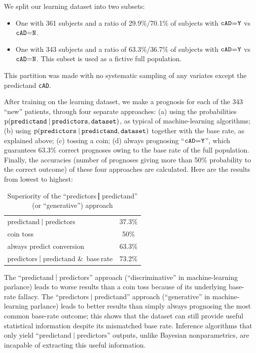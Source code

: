 \documentclass[a4paper,12pt,%
onecolumn,oneside,article,%
british%
]{memoir}
\theoremstyle{remark}
\theoremstyle{innote}
\newcommand*{\amp}{\&}
\newcommand*{\p}{\mathrm{p}}%
\renewcommand*{\|}[1][]{\nonscript\:#1\vert\nonscript\:\mathopen{}}
\newcommand*{\mo}[1][=]{\mathclose{}\mathord{\nonscript\mkern0.5mu#1\nonscript\mkern0.5mu}\mathopen{}}
\newcommand*{\cad}{\texttt{cAD}}
\newcommand*{\yes}{\texttt{Y}}
\newcommand*{\no}{\texttt{N}}
\newcommand*{\predictors}{\texttt{predictors}}
\newcommand*{\predictand}{\texttt{predictand}}
\newcommand*{\dataset}{\texttt{dataset}}
\begin{document}
\begin{table}[p]
  \small
  \begin{framed}
  \caption{Superiority of the \enquote{predictors$\pmb{\|}$predictand} (or \enquote{generative}) approach}
  \label{tab:superiority_predictors_given_predictand}
  We split our learning dataset into two subsets:
    \begin{itemize}[itemindent=3em]
    \item One with 361 subjects and a ratio of 29.9\%/70.1\% of subjects with $\cad\mo\yes$ vs $\cad\mo\no$.
    \item One with 343 subjects and a ratio of 63.3\%/36.7\% of subjects with $\cad\mo\yes$ vs $\cad\mo\no$. This subset is used as a fictive full population.
    \end{itemize}
    This partition was made with no systematic sampling of any variates except the predictand \cad.

    \smallskip After training on the learning dataset, we make a prognosis for each of the 343 \enquote{new} patients, through four separate approaches: (a) using the probabilities $\p(\predictand \| \predictors, \dataset)$, as typical of machine-learning algorithms; (b) using $\p(\predictors \| \predictand, \dataset)$ together with the base rate, as explained above; (c) tossing a coin; (d) always prognosing \enquote{$\cad\mo\yes$}, which guarantees 63.3\% correct prognoses owing to the base rate of the full population. Finally, the accuracies (number of prognoses giving more than 50\% probability to the correct outcome) of these four approaches are calculated. Here are the results from lowest to highest:

    \medskip
    {
      \centering
      \begin{tabular}{lc}
        {\footnotesize predictand$\|$predictors}& 37.3\%
        \\[1\jot]
        {\footnotesize coin toss}&50\%
        \\[1\jot]
        {\footnotesize always predict conversion}& 63.3\%
        \\[1\jot]
        {\footnotesize predictors$\|$predictand \amp\ base\,rate}&73.2\%
      \end{tabular}

    }
    \medskip
    
    The \enquote{predictand$\|$predictors} approach (\enquote{discriminative} in machine-learning parlance) leads to worse results than a coin toss because of its underlying base-rate fallacy. The \enquote{predictors$\|$predictand} approach (\enquote{generative} in machine-learning parlance) leads to better results than simply always prognosing the most common base-rate outcome; this shows that the dataset can still provide useful statistical information despite its mismatched base rate. Inference algorithms that only yield \enquote{predictand$\|$predictors} outputs, unlike Bayesian nonparametrics, are incapable of extracting this useful information.
  \end{framed}
\end{table}
\end{document}
